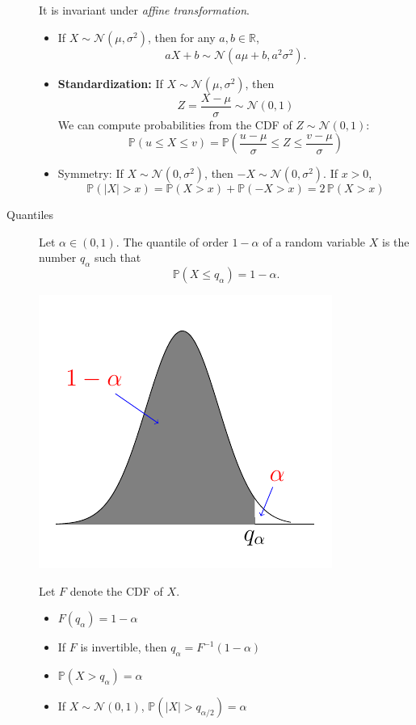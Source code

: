 \documentclass[a4paper, 10pt,landscape]{article}
\begin{document}
\begin{multicols*}{3}
\begin{description}
	It is invariant under {\it affine transformation}.
	\begin{itemize}
	\item  If $X\sim\mathcal{N}\left(\mu,\sigma^2\right)$, then for any $a,b\in\mathbb{R}$,
	$$aX+b\sim\mathcal{N}\left(a\mu+b,a^2\sigma^2\right).$$
	\item {\bf Standardization:} If $X\sim\mathcal{N}\left(\mu,\sigma^2\right)$, then
	$$Z=\dfrac{X-\mu}{\sigma}\sim\mathcal{N}\left(0,1\right)$$
	We can compute probabilities from the CDF of $Z\sim\mathcal{N}\left(0,1\right)$:
	$$\mathbb{P}\left(u\leq X\leq v\right)=\mathbb{P}\left(\dfrac{u-\mu}{\sigma}\leq Z\leq\dfrac{v-\mu}{\sigma}\right)$$
	\item {Symmetry:} If $X\sim\mathcal{N}\left(0,\sigma^2\right)$, then $-X\sim\mathcal{N}\left(0,\sigma^2\right)$. If $x>0$,
	$$\mathbb{P}\left(|X|>x\right)=\mathbb{P}\left(X>x\right)+\mathbb{P}\left(-X>x\right)=2\,\mathbb{P}\left(X>x\right)$$
	\end{itemize}
\item[Quantiles] Let $\alpha\in(0,1)$. The quantile of order $1-\alpha$ of a random variable $X$ is the number $q_\alpha$ such that $$\mathbb{P}\left(X\leq q_\alpha\right)=1-\alpha.$$
\begin{center}
	\includegraphics[width=0.4\columnwidth, trim={0 0.4cm 0 0.4cm}, clip]{quantile.pdf}
\end{center}
Let $F$ denote the CDF of $X$.
\begin{itemize}
	\item $F\left(q_\alpha\right)=1-\alpha$
	\item If $F$ is invertible, then $q_\alpha=F^{-1}\left(1-\alpha\right)$
	\item $\mathbb{P}\left(X>q_\alpha\right)=\alpha$
	\item If $X\sim\mathcal{N}\left(0,1\right)$, $\mathbb{P}\left(|X|>q_{\alpha/2}\right)=\alpha$
\end{itemize}
\end{description}



\end{multicols*}
\end{document}
